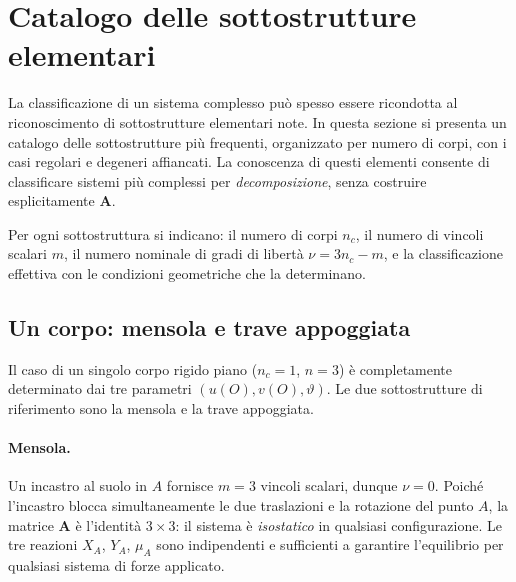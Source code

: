 \section{Catalogo delle sottostrutture elementari}
\label{sec:catalogo}

La classificazione di un sistema complesso può spesso essere
ricondotta al riconoscimento di sottostrutture elementari note.
In questa sezione si presenta un catalogo delle sottostrutture
più frequenti, organizzato per numero di corpi, con i casi
regolari e degeneri affiancati. La conoscenza di questi elementi
consente di classificare sistemi più complessi per
\emph{decomposizione}, senza costruire esplicitamente $\bm{A}$.

Per ogni sottostruttura si indicano: il numero di corpi $n_c$,
il numero di vincoli scalari $m$, il numero nominale di gradi
di libertà $\nu = 3n_c - m$, e la classificazione effettiva
con le condizioni geometriche che la determinano.

\subsection{Un corpo: mensola e trave appoggiata}
\label{sec:catalogo_1corpo}

Il caso di un singolo corpo rigido piano ($n_c = 1$, $n = 3$)
è completamente determinato dai tre parametri $(u(O), v(O), \vartheta)$.
Le due sottostrutture di riferimento sono la mensola e la trave
appoggiata.

\paragraph{Mensola.}
Un incastro al suolo in $A$ fornisce $m = 3$ vincoli scalari,
dunque $\nu = 0$. Poiché l'incastro blocca simultaneamente le
due traslazioni e la rotazione del punto $A$, la matrice
$\bm{A}$ è l'identità $3 \times 3$: il sistema è
\textit{isostatico} in qualsiasi configurazione. Le tre reazioni $X_A$, $Y_A$, $\mu_A$ sono 
indipendenti e sufficienti a garantire l'equilibrio 
per qualsiasi sistema di forze applicato.


